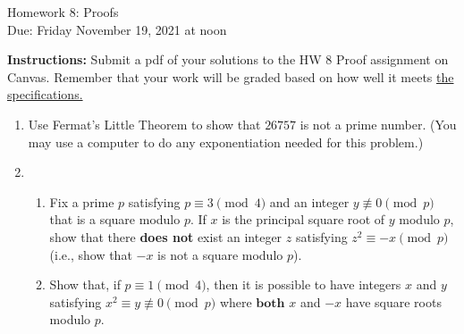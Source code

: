 \documentclass[10pt,a4paper]{article}
\begin{document}
\begin{center}
{\Large Homework 8: Proofs}\\
Due: Friday November 19, 2021 at noon\\


\end{center}
{\bf Instructions:} Submit a pdf of your solutions to the HW 8 Proof assignment on Canvas. Remember that your work will be graded based on how well it meets \href{https://docs.google.com/document/d/1emM06_WRh_h941rsjtRE9fRVndJtfRKd9gyS3Fs_rFA/edit?usp=sharing}{the specifications. }

\begin{enumerate}
\item Use Fermat's Little Theorem to show that $26757$ is not a prime number. (You may use a computer to do any exponentiation needed for this problem.)
\item \begin{enumerate}
 \item Fix a prime $p$ satisfying $p \equiv 3 \pmod 4$ and an integer $y \not \equiv 0 \pmod p$ that is a square modulo $p$.  If $x$ is the principal square root of $y$ modulo $p$, show that there \textbf{does not} exist an integer $z$ satisfying $z^2 \equiv -x \pmod p$ (i.e., show that $-x$ is not a square modulo $p$).
 \item Show that, if $p\equiv 1\pmod 4$, then it is possible to have integers $x$ and $y$ satisfying $x^2 \equiv y \not \equiv 0 \pmod p$ where $\textbf{both}$ $x$ and $-x$ have square roots modulo $p$.
\end{enumerate}

\end{enumerate}
\end{document}

